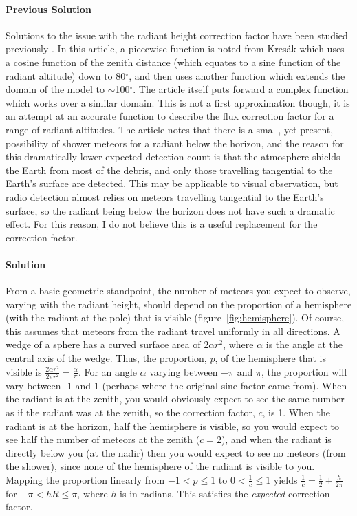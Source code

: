 \paragraph{Previous Solution}
Solutions to the issue with the radiant height correction factor have been studied previously \cite{hr_correction}. In this article, a piecewise function is noted from Kres\'{a}k \cite{kresak} which uses a cosine function of the zenith distance (which equates to a sine function of the radiant altitude) down to 80$^{\circ}$, and then uses another function which extends the domain of the model to $\sim$100$^{\circ}$. The article itself puts forward a complex function which works over a similar domain. This is not a first approximation though, it is an attempt at an accurate function to describe the flux correction factor for a range of radiant altitudes. The article notes that there is a small, yet present, possibility of shower meteors for a radiant below the horizon, and the reason for this dramatically lower expected detection count is that the atmosphere shields the Earth from most of the debris, and only those travelling tangential to the Earth's surface are detected. This may be applicable to visual observation, but radio detection almost relies on meteors travelling tangential to the Earth's surface, so the radiant being below the horizon does not have such a dramatic effect. For this reason, I do not believe this is a useful replacement for the correction factor.

\paragraph{Solution\\}
From a basic geometric standpoint, the number of meteors you expect to observe, varying with the radiant height, should depend on the proportion of a hemisphere (with the radiant at the pole) that is visible (figure~\ref{fig:hemisphere}). Of course, this assumes that meteors from the radiant travel uniformly in all directions. A wedge of a sphere has a curved surface area of $2{\alpha}r^2$, where $\alpha$ is the angle at the central axis of the wedge. Thus, the proportion, $p$, of the hemisphere that is visible is $\frac{2{\alpha}r^2}{2{\pi}r^2} = \frac{\alpha}{\pi}$. For an angle $\alpha$ varying between $-\pi$ and $\pi$, the proportion will vary between -1 and 1 (perhaps where the original sine factor came from). When the radiant is at the zenith, you would obviously expect to see the same number as if the radiant was at the zenith, so the correction factor, $c$, is 1. When the radiant is at the horizon, half the hemisphere is visible, so you would expect to see half the number of meteors at the zenith ($c = 2$), and when the radiant is directly below you (at the nadir) then you would expect to see no meteors (from the shower), since none of the hemisphere of the radiant is visible to you. Mapping the proportion linearly from $-1 < p \leq 1$ to $0 < \frac{1}{c} \leq 1$ yields $\frac{1}{c} = \frac{1}{2} + \frac{h}{2\pi}$ for $-\pi < hR \leq \pi$, where $h$ is in radians. This satisfies the \textit{expected} correction factor.

